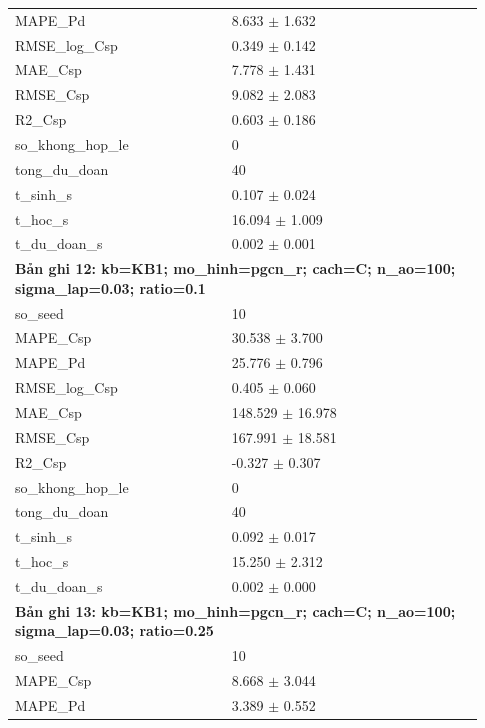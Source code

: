 \begin{longtable}{p{0.43\linewidth}p{0.50\linewidth}}
MAPE\_\allowbreak Pd & 8.633 $\pm$ 1.632 \\
RMSE\_\allowbreak log\_\allowbreak Csp & 0.349 $\pm$ 0.142 \\
MAE\_\allowbreak Csp & 7.778 $\pm$ 1.431 \\
RMSE\_\allowbreak Csp & 9.082 $\pm$ 2.083 \\
R2\_\allowbreak Csp & 0.603 $\pm$ 0.186 \\
so\_\allowbreak khong\_\allowbreak hop\_\allowbreak le & 0 \\
tong\_\allowbreak du\_\allowbreak doan & 40 \\
t\_\allowbreak sinh\_\allowbreak s & 0.107 $\pm$ 0.024 \\
t\_\allowbreak hoc\_\allowbreak s & 16.094 $\pm$ 1.009 \\
t\_\allowbreak du\_\allowbreak doan\_\allowbreak s & 0.002 $\pm$ 0.001 \\
\midrule
\multicolumn{2}{p{0.95\linewidth}}{\textbf{Bản ghi 12: kb=KB1; mo\_hinh=pgcn\_r; cach=C; n\_ao=100; sigma\_lap=0.03; ratio=0.1}} \\
so\_\allowbreak seed & 10 \\
MAPE\_\allowbreak Csp & 30.538 $\pm$ 3.700 \\
MAPE\_\allowbreak Pd & 25.776 $\pm$ 0.796 \\
RMSE\_\allowbreak log\_\allowbreak Csp & 0.405 $\pm$ 0.060 \\
MAE\_\allowbreak Csp & 148.529 $\pm$ 16.978 \\
RMSE\_\allowbreak Csp & 167.991 $\pm$ 18.581 \\
R2\_\allowbreak Csp & -0.327 $\pm$ 0.307 \\
so\_\allowbreak khong\_\allowbreak hop\_\allowbreak le & 0 \\
tong\_\allowbreak du\_\allowbreak doan & 40 \\
t\_\allowbreak sinh\_\allowbreak s & 0.092 $\pm$ 0.017 \\
t\_\allowbreak hoc\_\allowbreak s & 15.250 $\pm$ 2.312 \\
t\_\allowbreak du\_\allowbreak doan\_\allowbreak s & 0.002 $\pm$ 0.000 \\
\midrule
\multicolumn{2}{p{0.95\linewidth}}{\textbf{Bản ghi 13: kb=KB1; mo\_hinh=pgcn\_r; cach=C; n\_ao=100; sigma\_lap=0.03; ratio=0.25}} \\
so\_\allowbreak seed & 10 \\
MAPE\_\allowbreak Csp & 8.668 $\pm$ 3.044 \\
MAPE\_\allowbreak Pd & 3.389 $\pm$ 0.552 \\

\end{longtable}

